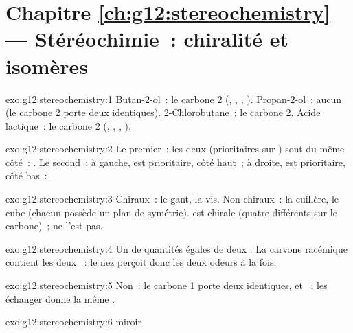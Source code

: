 \section*{Chapitre \ref{ch:g12:stereochemistry} --- Stéréochimie~: chiralité et isomères}

\begin{solution}{exo:g12:stereochemistry:1}
Butan-2-ol~: le carbone 2 (, , , ).
Propan-2-ol~: aucun (le carbone 2 porte deux  identiques).
2-Chlorobutane~: le carbone 2. Acide lactique~: le carbone 2 (,
,
, ).
\end{solution}

\begin{solution}{exo:g12:stereochemistry:2}
Le premier~: les deux  (prioritaires sur ) sont du même
côté~: . Le second~: à gauche,  est prioritaire, côté haut~; à
droite,  est prioritaire, côté bas~: .
\end{solution}

\begin{solution}{exo:g12:stereochemistry:3}
Chiraux~: le gant, la vis. Non chiraux~: la cuillère, le cube (chacun
possède un plan de symétrie).  est chirale (quatre 
différents sur le carbone)~;  ne l'est pas.
\end{solution}

\begin{solution}{exo:g12:stereochemistry:4}
Un  de quantités égales de deux . La carvone
racémique contient les deux ~: le nez perçoit donc les deux
odeurs à la fois.
\end{solution}

\begin{solution}{exo:g12:stereochemistry:5}
Non~: le carbone 1 porte deux  identiques,  et ~; les
échanger donne la même .
\end{solution}

\begin{solution}{exo:g12:stereochemistry:6}
 \quad miroir
\quad {}
\end{solution}

